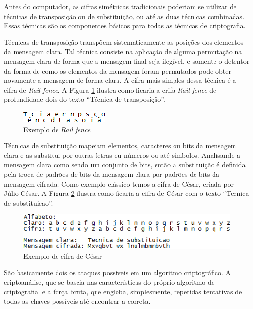 Antes do computador, as cifras simétricas tradicionais poderiam se utilizar de técnicas de transposição ou de substituição, ou até as duas técnicas combinadas. Essas técnicas são os componentes básicos para todas as técnicas de criptografia.

Técnicas de transposição transpõem sistematicamente as posições dos elementos da mensagem clara. Tal técnica consiste na aplicação de alguma permutação na mensagem clara de forma que a mensagem final seja ilegível, e somente o detentor da forma de como os elementos da mensagem foram permutados pode obter novamente a mensagem de forma clara. A cifra mais simples dessa técnica é a cifra de \textit{Rail fence}. A Figura \ref{fig:railfence} ilustra como ficaria a crifa \textit{Rail fence} de profundidade dois do texto “Técnica de transposição”.

\begin{figure}[H]
    \centering
    \caption{Exemplo de \textit{Rail fence}}
    \label{fig:railfence}
    \includegraphics{Figuras/RailFence.png}
\end{figure}

Técnicas de substituição mapeiam elementos, caracteres ou bits da mensagem clara e as substitui por outras letras ou números ou até símbolos. Analisando a mensagem clara como sendo um conjunto de bits, então a substituição é definida pela troca de padrões de bits da mensagem clara por padrões de bits da mensagem cifrada. Como exemplo clássico temos a cifra de César, criada por Júlio César. A Figura \ref{fig:cifradecesar} ilustra como ficaria a cifra de César com o texto “Tecnica de substituicao”.

\begin{figure}[H]
    \centering
    \caption{Exemplo de cifra de César}
    \label{fig:cifradecesar}
    \includegraphics{Figuras/CifraDeCesar.png}
\end{figure}

São basicamente dois os ataques possíveis em um algoritmo criptográfico. A criptoanálise, que se baseia nas características do próprio algoritmo de criptografia, e a força bruta, que engloba, simplesmente, repetidas tentativas de todas as chaves possíveis até encontrar a correta.

